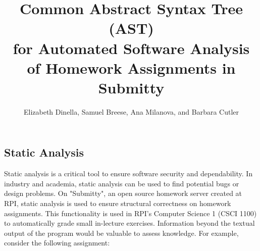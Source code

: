 \documentclass[thesis]{hmcposter}
\title{Common Abstract Syntax Tree (AST) \\ for Automated Software Analysis \\ of Homework Assignments in Submitty}
\author{Elizabeth Dinella, Samuel Breese, Ana Milanova, and Barbara Cutler}
\begin{document}
\begin{poster}

\section{Static Analysis}
Static analysis is a critical tool to ensure software security and dependability. In industry and academia, static analysis can be used to find potential bugs or design problems. On "Submitty", an open source homework server created at RPI, static analysis is used to ensure structural correctness on homework assignments. This functionality is used in RPI's Computer Science 1 (CSCI 1100) to automatically grade small in-lecture exercises. Information beyond the textual output of the program would be valuable to assess knowledge. For example, consider the following assignment:


\begin{figure}
\begin{center}
\end{center}
\end{figure}


\end{poster}
\end{document}
